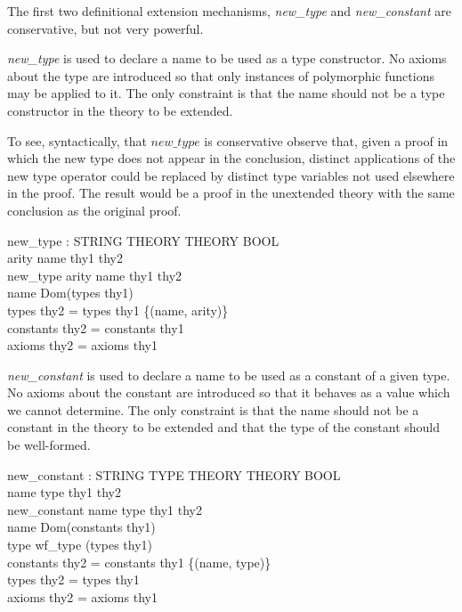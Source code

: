 \documentclass[a4paper,11pt,titlepage]{article}
\begin{document}
\begin{titlepage}
The first two definitional extension mechanisms,
{\it new\_type} and {\it new\_constant} are
conservative, but not very powerful.

{\it new\_type}  is used to declare a name to be used
as a type constructor. No axioms about the type are
introduced so that only instances of polymorphic
functions may be applied to it.
The only constraint is that the name should not
be a type constructor in the theory to be extended.

To see, syntactically, that $new\_type$ is conservative
observe that, given a proof in which the new type does
not appear in the conclusion, distinct applications of
the new type operator could be replaced by distinct
type variables not used elsewhere in the proof. The result
would be a proof in the unextended theory with the same
conclusion as the original proof.

\begin{HOLConst}
\+	\PrNL{}new\_type\PrNN{} : \PrOO{} \MMM{\rightarrow} STRING \MMM{\rightarrow} THEORY \MMM{\rightarrow} THEORY \MMM{\rightarrow} BOOL\\
\PrPH{}
\+	\MMM{\forall} arity name thy1 thy2 \MMM{\bullet}\\
\+	new\_type arity name thy1 thy2 \MMM{\Leftrightarrow}\\
\+	\MMM{\lnot} name \MMM{\in} Dom(types thy1) \MMM{\land}\\
\+	types thy2  = types thy1 \MMM{\cup} \{(name, arity)\} \MMM{\land}\\
\+	constants thy2 = constants thy1 \MMM{\land}\\
\+	axioms thy2 = axioms thy1\\
\end{HOLConst}
{\it new\_constant}  is used to declare a name to be used
as a constant of a given type.
No axioms about the constant are
introduced so that it behaves as a value
which we cannot determine.
The only constraint is that the name should not
be a constant in the theory to be extended and that the type of the constant
should be well-formed.

\begin{HOLConst}
\+	\PrNL{}new\_constant\PrNN{} : STRING \MMM{\rightarrow} TYPE \MMM{\rightarrow} THEORY \MMM{\rightarrow} THEORY \MMM{\rightarrow} BOOL\\
\PrPH{}
\+	\MMM{\forall} name type thy1 thy2 \MMM{\bullet}\\
\+	new\_constant name type thy1 thy2 \MMM{\Leftrightarrow}\\
\+	\MMM{\lnot} name \MMM{\in} Dom(constants thy1) \MMM{\land}\\
\+	type \MMM{\in} wf\_type (types thy1) \MMM{\land}\\
\+	constants thy2  = constants thy1 \MMM{\cup} \{(name, type)\} \MMM{\land}\\
\+	types thy2 = types thy1 \MMM{\land}\\
\+	axioms thy2 = axioms thy1\\
\end{HOLConst}


\end{titlepage}
\end{document}
